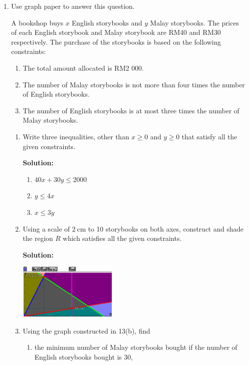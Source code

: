 \documentclass{report}
\newcommand{\sol}{\textbf{Solution:}}
\begin{document}
\begin{enumerate}[leftmargin=*]
    \item Use graph paper to answer this question.

          A bookshop buys $x$ English storybooks and $y$ Malay storybooks. The prices of
          each English storybook and Malay storybook are RM40 and RM30 respectively. The
          purchase of the storybooks is based on the following constraints:

          \begin{enumerate}[label=\Roman{*}:]
              \item The total amount allocated is RM2 000.
              \item The number of Malay storybooks is not more than four times the number of
                    English storybooks.
              \item The number of English storybooks is at most three times the number of Malay
                    storybooks.
          \end{enumerate}
          \begin{enumerate}
              \item Write three inequalities, other than $x \geqslant 0$ and $y \geqslant 0$ that
                    satisfy all the given constraints.

                    \sol{}
                    \begin{enumerate}[label=\Roman{*}:]
                        \item $40x + 30y \leq 2000$
                        \item $y \leq 4x$
                        \item $x \leq 3y$
                    \end{enumerate}

              \item Using a scale of $2 \mathrm{~cm}$ to 10 storybooks on both axes, construct and
                    shade the region $R$ which satisfies all the given constraints.

                    \sol{}
                    \begin{center}
                        \includegraphics[width=0.4\textwidth]{./assets/13.4.png}
                    \end{center}
              \item Using the graph constructed in 13(b), find
                    \begin{enumerate}
                        \item the minimum number of Malay storybooks bought if the number of English
                              storybooks bought is 30,


\end{enumerate}
\end{enumerate}
\end{enumerate}
\end{document}
